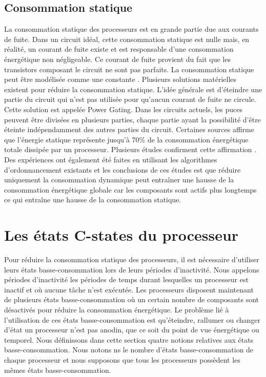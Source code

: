 \subsection{Consommation statique}
La consommation statique des processeurs est en grande
partie due aux courants de fuite.  Dans un circuit idéal, cette
consommation statique est nulle mais, en réalité, un courant de fuite
existe et est responsable d’une consommation énergétique non
négligeable.  Ce courant de fuite provient du fait que les transistors
composant le circuit ne sont pas parfaits.  La consommation statique
peut être modélisée comme une constante \cite{KAB+03, SJPL08}.
Plusieurs solutions matérielles existent pour réduire la consommation
statique.  L’idée générale est d’éteindre une partie du circuit qui
n’est pas utilisée pour qu’aucun courant de fuite ne circule.  Cette
solution est appelée Power Gating. Dans les circuits actuels, les
puces peuvent être divisées en plusieurs parties, chaque partie ayant
la possibilité d’être éteinte indépendamment des autres parties du
circuit. Certaines sources \cite{HXW+10} affirme que l’énergie
statique représente jusqu’à 70\% de la consommation énergétique totale
dissipée par un processeur.  Plusieurs études confirment cette
affirmation \cite{Bor99, SBA+01, KAB+03, ABM+04, HSC+11, BBMB13}. Des
expériences ont également été faites \cite{SRH05, SPH05, LSH10} en
utilisant les algorithmes d’ordonnancement existants et les
conclusions de ces études est que réduire uniquement la consommation
dynamique peut entraîner une hausse de la consommation énergétique
globale car les composants sont actifs plus longtemps ce qui entraîne
une hausse de la consommation statique.

\section{Les états C-states du processeur}
\label{sec:cstate}
Pour réduire la consommation statique des processeurs, il est
nécessaire d’utiliser leurs états basse-consommation lors de leurs
périodes d’inactivité.  Nous appelons périodes d’inactivité les
périodes de temps durant lesquelles un processeur est inactif et où
aucune tâche n’est exécutée.  Les processeurs disposent maintenant de
plusieurs états basse-consommation où un certain nombre de composants
sont désactivés pour réduire la consommation énergétique.  Le problème
lié à l’utilisation de ces états basse-consommation est qu’éteindre,
rallumer ou changer d’état un processeur n’est pas anodin, que ce soit
du point de vue énergétique ou temporel. Nous définissons dans cette
section quatre notions relatives aux états basse-consommation. Nous
notons ns le nombre d’états basse-consommation de chaque processeur et
nous supposons que tous les processeurs possèdent les mêmes états
basse-consommation.

